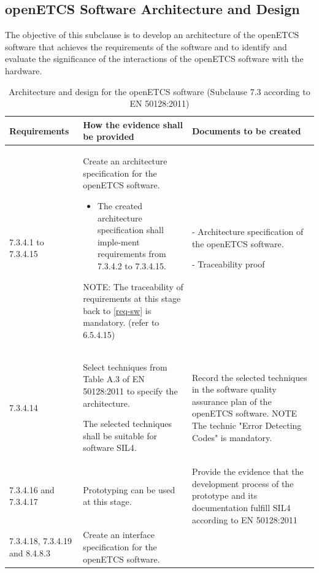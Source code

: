 \documentclass{template/openetcs_report}
\begin{document}
\subsection{openETCS Software Architecture and Design}
\label{arc-sw}
\begin{flushleft}
The objective of this subclause is to develop an architecture of the openETCS software that achieves the requirements of the software and to identify and evaluate the significance of the interactions of the openETCS software with the hardware.
\end{flushleft}
{\footnotesize\sffamily\centering
\begin{longtable}{|p{2cm}|p{9cm}|p{3cm}|}
\caption{Architecture and design for the openETCS software (Subclause 7.3 according to EN 50128:2011)}\\
\hline
\bfseries Requirements & \bfseries How the evidence shall be provided & \bfseries Documents to be created\\
\hline
\hline
\endhead
\hline
\endfoot

7.3.4.1 to 7.3.4.15 & Create an architecture specification for the openETCS software.
\begin{itemize}\itemsep=0pt
  \item The created architecture specification shall imple-ment requirements from 7.3.4.2 to 7.3.4.15.
\end{itemize}
NOTE: \linebreak
The traceability of requirements at this stage back to \ref{req-sw} is mandatory. (refer to 6.5.4.15)
& - Architecture specification of the openETCS software.

- Traceability proof\\ 
\hline
7.3.4.14 & Select techniques from Table A.3 of EN 50128:2011 to specify the architecture.

The selected techniques shall be suitable for software SIL4.
& Record the selected techniques in the software quality assurance plan of the openETCS software.
\linebreak
\linebreak
NOTE\linebreak
The technic "Error Detecting Codes" is mandatory.\\ 
\hline
7.3.4.16 and 7.3.4.17 & Prototyping can be used at this stage.
& Provide the evidence that the development process of the prototype and its documentation fulfill SIL4 according to EN 50128:2011\\ 
\hline
7.3.4.18, 7.3.4.19 and 8.4.8.3 & Create an interface specification for the openETCS software.
 

\end{longtable}}
\end{document}

